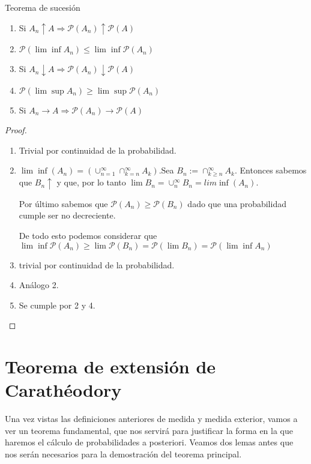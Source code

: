 \documentclass[12pt,a4paper]{book}
\begin{document}
\begin{theorem}
Teorema de sucesión
\begin{enumerate}
\item Si $A_n \uparrow A \Rightarrow \mathcal{P} (A_n) \uparrow \mathcal{P}(A)$
\item $\mathcal{P}(\lim \inf A_n) \leq \lim \inf \mathcal{P}(A_n)$
\item Si $A_n \downarrow A \Rightarrow \mathcal{P} (A_n) \downarrow \mathcal{P}(A)$
\item $\mathcal{P}(\lim \sup A_n) \geq \lim \sup \mathcal{P}(A_n)$
\item Si $A_n \rightarrow A \Rightarrow \mathcal{P} (A_n) \rightarrow \mathcal{P}(A)$
\end{enumerate}
\end{theorem}

\begin{proof}
\begin{enumerate} 
	\item Trivial por continuidad de la probabilidad.
	\item $\lim \inf (A_n) = (\cup_{n=1}^\infty\cap_{k=n}^\infty A_k)$.Sea $B_n := \cap_{k\geq n}^\infty A_k$. Entonces sabemos que $B_n \uparrow$ y que, por lo tanto $\lim B_n = \cup_n^\infty B_n = lim \inf (A_n)$. 
	
	Por último sabemos que $\mathcal{P}(A_n) \geq \mathcal{P}(B_n)$ dado que una probabilidad cumple ser  no decreciente.
	
	De todo esto podemos considerar que $\lim \inf \mathcal{P}(A_n) \geq \lim \mathcal{P}(B_n) = \mathcal{P}(\lim B_n) = \mathcal{P}(\lim \inf A_n)$
	
	\item trivial por continuidad de la probabilidad.
	
	\item Análogo 2.
	
	\item Se cumple por 2  y 4.
\end{enumerate}
\end{proof}

\section{Teorema de extensión de Carathéodory}

Una vez vistas las definiciones anteriores de medida y medida exterior, vamos a ver un teorema fundamental, que nos servirá para justificar la forma en la que haremos el cálculo de probabilidades a posteriori. Veamos dos lemas antes que nos serán necesarios para la demostración del teorema principal.\\
\end{document}

